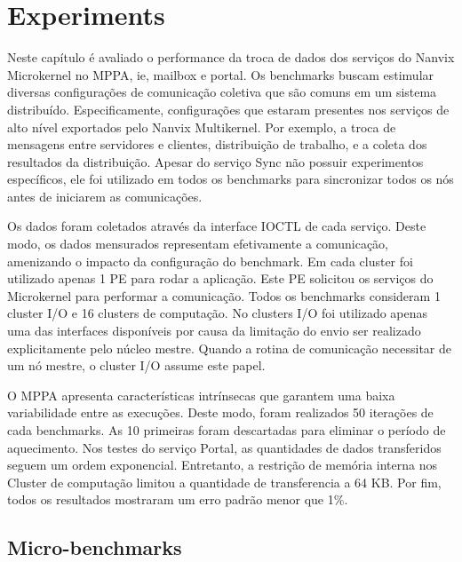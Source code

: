 \chapter{Experiments}
\label{ch.experiments}

	Neste capítulo é avaliado o performance da troca de dados dos serviços do Nanvix Microkernel no MPPA, ie, mailbox e portal.
	Os benchmarks buscam estimular diversas configurações de comunicação coletiva que são comuns em um sistema distribuído.
	Especificamente, configurações que estaram presentes nos serviços de alto nível exportados pelo Nanvix Multikernel.
	Por exemplo, a troca de mensagens entre servidores e clientes, distribuição de trabalho, e a coleta dos resultados da distribuição.
	Apesar do serviço Sync não possuir experimentos específicos, ele foi utilizado em todos os benchmarks para sincronizar todos os nós antes de iniciarem as comunicações.

	Os dados foram coletados através da interface IOCTL de cada serviço.
	Deste modo, os dados mensurados representam efetivamente a comunicação, amenizando o impacto da configuração do benchmark.
	Em cada cluster foi utilizado apenas 1 PE para rodar a aplicação.
	Este PE solicitou os serviços do Microkernel para performar a comunicação.
	Todos os benchmarks consideram 1 cluster I/O e 16 clusters de computação.
	No clusters I/O foi utilizado apenas uma das interfaces disponíveis por causa da limitação do envio ser realizado explicitamente pelo núcleo mestre.
	Quando a rotina de comunicação necessitar de um nó mestre, o cluster I/O assume este papel.

	O MPPA apresenta características intrínsecas que garantem uma baixa variabilidade entre as execuções.
	Deste modo, foram realizados 50 iterações de cada benchmarks.
	As 10 primeiras foram descartadas para eliminar o período de aquecimento.
	Nos testes do serviço Portal, as quantidades de dados transferidos seguem um ordem exponencial.
	Entretanto, a restrição de memória interna nos Cluster de computação limitou a quantidade de transferencia a 64 KB.
	Por fim, todos os resultados mostraram um erro padrão menor que 1\%.

	\section{Micro-benchmarks}

